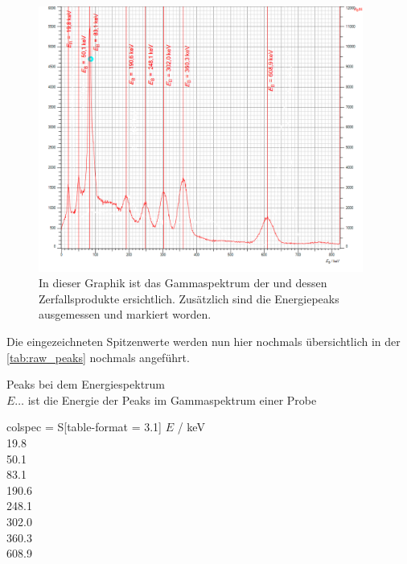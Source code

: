 \documentclass[12pt,english,ngerman]{scrartcl}
\begin{document}
\begin{figure}[H]
  \begin{center}
    \includegraphics[width = 0.95\textwidth]{figures/Ra226kennlinien.png}
  \end{center}
  \caption[Energiespektrum der $\gamma$-Strahlung einer  Probe]{
    In dieser Graphik ist das Gammaspektrum der  und dessen
    Zerfallsprodukte ersichtlich. Zusätzlich sind die Energiepeaks ausgemessen
    und markiert worden.
  }
  \label{fig:Ra226zerfallsreihe}
\end{figure}

Die eingezeichneten Spitzenwerte werden nun hier nochmals übersichtlich in der
\autoref{tab:raw_peaks} nochmals angeführt.

\begin{table}[H]
  \caption{Peaks bei dem  Energiespektrum\\
    $E \dots$ ist die Energie der Peaks im Gammaspektrum einer  Probe
  }
  \label{tab:raw_peaks}
  \centering
  \begin{tblr}{colspec = {S[table-format = 3.1]}}
    {{{{ $E$ / \si{\kilo\electronvolt}}}}} \\
    19.8   \\
    50.1   \\
    83.1  \\
    190.6  \\
    248.1  \\
    302.0  \\
    360.3  \\
    608.9  \\
  \end{tblr}
\end{table}
\end{document}
